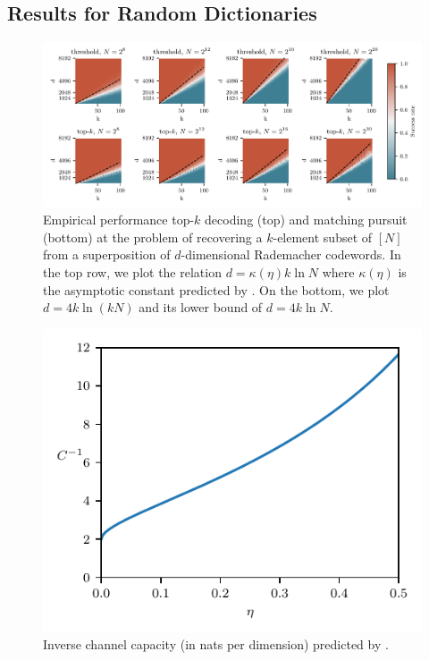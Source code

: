 \subsection{Results for Random Dictionaries \label{sec:random-results}}

\begin{figure}
	\begin{center}
	\includegraphics[width=\textwidth]{../figures/one_step_decode_rs_horiz}
	\caption{Empirical performance top-$k$ decoding (top) and matching pursuit (bottom) at the problem of recovering a $k$-element subset of $[N]$ from a superposition of $d$-dimensional Rademacher codewords. In the top row, we plot the relation $d = \kappa(\eta) k \ln N$ where $\kappa(\eta)$ is the asymptotic constant predicted by . On the bottom, we plot $d = 4 k \ln (k N)$ and its lower bound of $d = 4 k \ln N.$}
	\label{fig:one-step}
	\end{center}
\end{figure}

\begin{figure}
	\begin{center}
	\includegraphics[width=\textwidth]{../figures/capacity}
	\caption{Inverse channel capacity (in nats per dimension) predicted by .}
	\label{fig:capacity}
	\end{center}
\end{figure}

